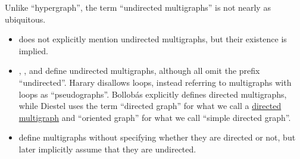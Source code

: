 \begin{comments}
  \item Unlike \enquote{hypergraph}, the term \enquote{undirected multigraphs} is not nearly as ubiquitous.
  \begin{itemize}
    \item {} does not explicitly mention undirected multigraphs, but their existence is implied.

    \item {}, ,  and  define undirected multigraphs, although all omit the prefix \enquote{undirected}. Harary disallows loops, instead referring to multigraphs with loops as \enquote{pseudographs}. Bollobás explicitly defines directed multigraphs, while Diestel uses the term \enquote{directed graph} for what we call a \hyperref[def:directed_multigraph]{directed multigraph} and \enquote{oriented graph} for what we call \enquote{simple directed graph}.

    \item {} define multigraphs without specifying whether they are directed or not, but later implicitly assume that they are undirected.
  \end{itemize}
\end{comments}

